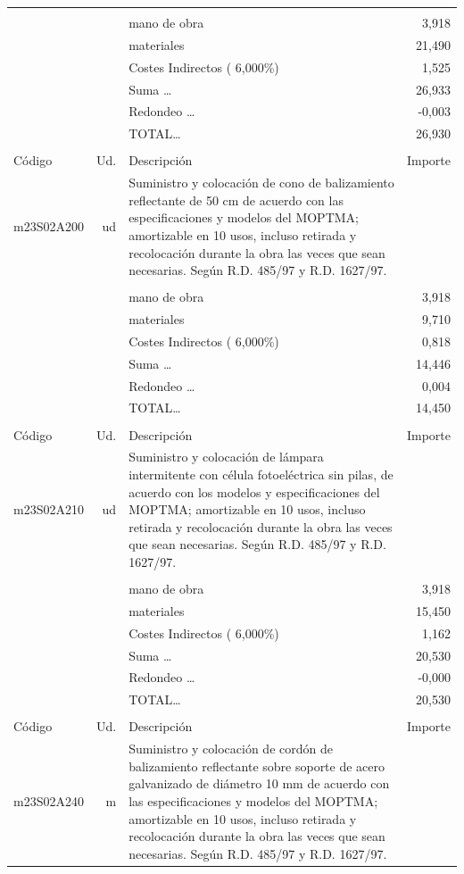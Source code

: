 \documentclass{book}%
\begin{document}
\begin{supertabular}{l r p{60mm} r}
&&&\\%
&&mano de obra&     3,918\\%
&&materiales&    21,490\\%
&&Costes Indirectos (     6,000\%)&     1,525\\%
&&Suma \ldots&    26,933\\%
&&Redondeo \ldots&    {-}0,003\\%
%
&&TOTAL\ldots&    26,930\\%
&&&\\%
Código&Ud.&Descripción&Importe\\%
\hline%
m23S02A200&ud&Suministro y colocación de cono de balizamiento reflectante de 50 cm de acuerdo con las especificaciones y modelos del MOPTMA; amortizable en 10 usos, incluso retirada y recolocación durante la obra las veces que sean necesarias. Según R.D. 485/97 y R.D. 1627/97.&\\%
&&&\\%
&&mano de obra&     3,918\\%
&&materiales&     9,710\\%
&&Costes Indirectos (     6,000\%)&     0,818\\%
&&Suma \ldots&    14,446\\%
&&Redondeo \ldots&     0,004\\%
%
&&TOTAL\ldots&    14,450\\%
&&&\\%
Código&Ud.&Descripción&Importe\\%
\hline%
m23S02A210&ud&Suministro y colocación de lámpara intermitente con célula fotoeléctrica sin pilas, de acuerdo con los modelos y especificaciones del MOPTMA; amortizable en 10 usos, incluso retirada y recolocación durante la obra las veces que sean necesarias. Según R.D. 485/97 y R.D. 1627/97.&\\%
&&&\\%
&&mano de obra&     3,918\\%
&&materiales&    15,450\\%
&&Costes Indirectos (     6,000\%)&     1,162\\%
&&Suma \ldots&    20,530\\%
&&Redondeo \ldots&    {-}0,000\\%
%
&&TOTAL\ldots&    20,530\\%
&&&\\%
Código&Ud.&Descripción&Importe\\%
\hline%
m23S02A240&m&Suministro y colocación de cordón de balizamiento reflectante sobre soporte de acero galvanizado de diámetro 10 mm de acuerdo con las especificaciones y modelos del MOPTMA; amortizable en 10 usos, incluso retirada y recolocación durante la obra las veces que sean necesarias. Según R.D. 485/97 y R.D. 1627/97.&\\%

\end{supertabular}
\end{document}

